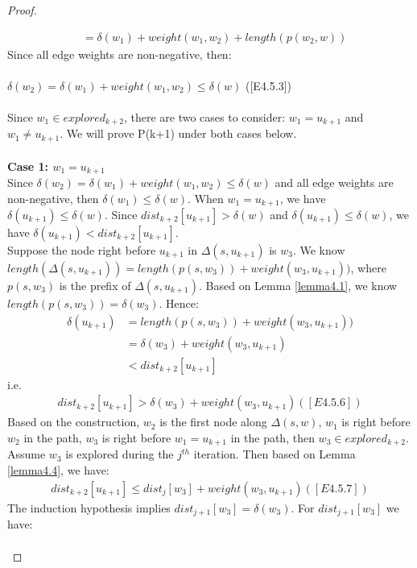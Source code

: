 \begin{proof}
\begin{itemize}
\begin{enumerate}
\begin{align*}
              &= \delta(w_1) + weight(w_1, w_2) + length(p(w_2, w))
  \end{align*}
  Since all edge weights are non-negative, then: 
  \\\\
    \tab $\delta(w_2) = \delta(w_1) + weight(w_1, w_2) \leq \delta(w)$ ([E4.5.3])
  \\\\
  Since $w_1 \in explored_{k+2}$, there are two cases to consider: $w_1 =u_{k+1}$ and $w_1 \neq u_{k+1}$. We will prove P(k+1) under both cases below. 
  \\\\
  \textbf{Case 1: $w_1 = u_{k+1}$}
  \\
  Since $\delta(w_2) = \delta(w_1) + weight(w_1, w_2) \leq \delta(w)$ and all edge weights are non-negative, then $\delta(w_1) \leq \delta(w)$. When $w_1 = u_{k+1}$, we have $\delta(u_{k+1}) \leq \delta(w)$. Since $dist_{k+2}[u_{k+1}] > \delta(w)$ and $\delta(u_{k+1}) \leq \delta(w)$, we have $\delta(u_{k+1}) < dist_{k+2}[u_{k+1}]$.
  \\
  Suppose the node right before $u_{k+1}$ in $\Delta(s, u_{k+1})$ is $w_3$. We know $length(\Delta(s, u_{k+1})) = length(p(s, w_3)) + weight(w_3, u_{k+1}))$, where $p(s, w_3)$ is the prefix of $\Delta(s, u_{k+1})$. Based on Lemma \ref{lemma4.1}, we know $length(p(s, w_3)) = \delta(w_3)$. Hence: 
  \begin{align*}
    \delta(u_{k+1}) &= length(p(s, w_3)) + weight(w_3, u_{k+1})) \\
                    &= \delta(w_3) + weight(w_3, u_{k+1}) \\
                    &< dist_{k+2}[u_{k+1}]
  \end{align*}
  i.e.
  \begin{align*}
    dist_{k+2}[u_{k+1}] > \delta(w_3) + weight(w_3, u_{k+1}) ([E4.5.6])
  \end{align*}
  Based on the construction, $w_2$ is the first node along $\Delta(s,w)$, $w_1$ is right before $w_2$ in the path, $w_3$ is right before $w_1 = u_{k+1}$ in the path, then $w_3 \in explored_{k+2}$. Assume $w_3$ is explored during the $j^{th}$ iteration. Then based on Lemma \ref{lemma4.4}, we have: 
  \begin{align*}
    dist_{k+2}[u_{k+1}] \leq dist_j[w_3] + weight(w_3, u_{k+1}) ([E4.5.7])
  \end{align*}
  The induction hypothesis implies $dist_{j+1}[w_3] = \delta(w_3)$. For $dist_{j+1}[w_3]$ we have: 
  \begin{align*}

\end{align*}
\end{enumerate}
\end{itemize}
\end{proof}
